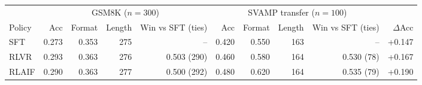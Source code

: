 \begin{tabular}{l rrrr rrrr r}
\toprule
 & \multicolumn{4}{c}{GSM8K ($n{=}300$)} & \multicolumn{4}{c}{SVAMP transfer ($n{=}100$)} & \\
\cmidrule(lr){2-5}\cmidrule(lr){6-9}
Policy & Acc & Format & Length & Win vs SFT (ties) & Acc & Format & Length & Win vs SFT (ties) & $\Delta$Acc \\
\midrule
SFT & 0.273 & 0.353 & 275 & -- & 0.420 & 0.550 & 163 & -- & +0.147 \\
RLVR & 0.293 & 0.363 & 276 & 0.503 (290) & 0.460 & 0.580 & 164 & 0.530 (78) & +0.167 \\
RLAIF & 0.290 & 0.363 & 277 & 0.500 (292) & 0.480 & 0.620 & 164 & 0.535 (79) & +0.190 \\
\bottomrule
\end{tabular}
